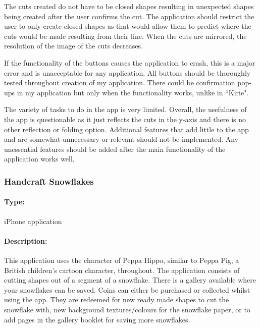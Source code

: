 \documentclass[11pt]{article}
\begin{document}
                The cuts created do not have to be closed shapes resulting in unexpected shapes being created after the user confirms the cut. The application should restrict the user to only create closed shapes as that would allow them to predict where the cuts would be made resulting from their line. When the cuts are mirrored, the resolution of the image of the cuts decreases. %
               
                If the functionality of the buttons causes the application to crash, this is a major error and is unacceptable for any application. All buttons should be thoroughly tested throughout creation of my application. There could be confirmation pop-ups in my application but only when the functionality works, unlike in ``Kirie".
                
                The variety of tasks to do in the app is very limited. Overall, the usefulness of the app is questionable as it just reflects the cuts in the y-axis and there is no other reflection or folding option. Additional features that add little to the app and are somewhat unnecessary or relevant should not be implemented. Any unessential features should be added after the main functionality of the application works well.
                
                
                 \subsubsection{Handcraft Snowflakes}
            
                \paragraph{Type:} iPhone application \cite{PeppaHippo}

                \paragraph{Description:}
                This application uses the character of Peppa Hippo, similar to Peppa Pig, a British children's cartoon character, throughout. The application consists of cutting shapes out of a segment of a snowflake. There is a gallery available where your snowflakes can be saved. Coins can either be purchased or collected whilst using the app. They are redeemed for new ready made shapes to cut the snowflake with, new background textures/colours for the snowflake paper, or to add pages in the gallery booklet for saving more snowflakes. 
\end{document}
